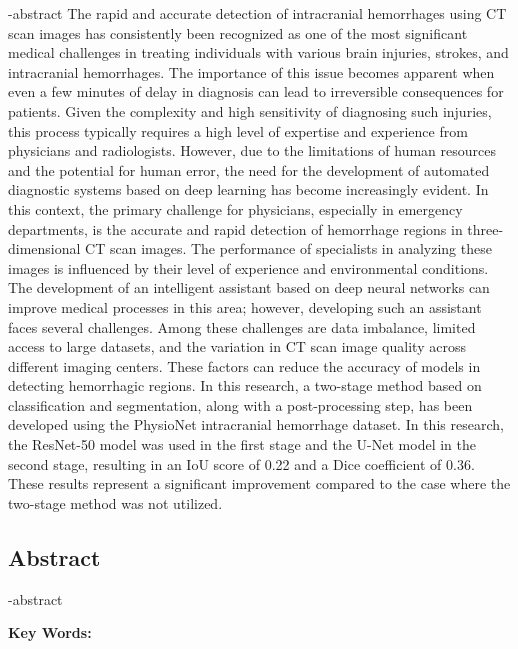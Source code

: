 
\en-abstract{
The rapid and accurate detection of intracranial hemorrhages using CT scan images has consistently been recognized as one of the most significant medical challenges in treating individuals with various brain injuries, strokes, and intracranial hemorrhages. The importance of this issue becomes apparent when even a few minutes of delay in diagnosis can lead to irreversible consequences for patients.
Given the complexity and high sensitivity of diagnosing such injuries, this process typically requires a high level of expertise and experience from physicians and radiologists. However, due to the limitations of human resources and the potential for human error, the need for the development of automated diagnostic systems based on deep learning has become increasingly evident.
In this context, the primary challenge for physicians, especially in emergency departments, is the accurate and rapid detection of hemorrhage regions in three-dimensional CT scan images. The performance of specialists in analyzing these images is influenced by their level of experience and environmental conditions.
The development of an intelligent assistant based on deep neural networks can improve medical processes in this area; however, developing such an assistant faces several challenges. Among these challenges are data imbalance, limited access to large datasets, and the variation in CT scan image quality across different imaging centers. These factors can reduce the accuracy of models in detecting hemorrhagic regions.
In this research, a two-stage method based on classification and segmentation, along with a post-processing step, has been developed using the PhysioNet intracranial hemorrhage dataset. In this research, the ResNet-50 model was used in the first stage and the U-Net model in the second stage, resulting in an IoU score of 0.22 and a Dice coefficient of 0.36. These results represent a significant improvement compared to the case where the two-stage method was not utilized.
}

\newpage
\thispagestyle{empty}
\begin{latin}
\section*{\LARGE\centering Abstract}

\een-abstract

\vspace*{.5cm}
{\large\textbf{Key Words:}}\par
\vspace*{.5cm}
\elatinkeywords
\end{latin}